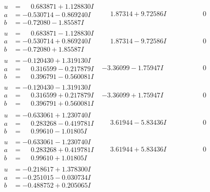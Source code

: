 \documentclass[1p]{elsarticle_modified}
\theoremstyle{definition}
\begin{document}
$$\begin{array}{c|c|c}
\begin{aligned}
u &= \phantom{-}0.683871 + 1.128830 I \\
a &= -0.530714 - 0.869240 I \\
b &= -0.72080 - 1.85587 I\end{aligned}
 & \phantom{-}1.87314 + 9.72586 I & \phantom{-0.000000 } 0 \\ \hline\begin{aligned}
u &= \phantom{-}0.683871 - 1.128830 I \\
a &= -0.530714 + 0.869240 I \\
b &= -0.72080 + 1.85587 I\end{aligned}
 & \phantom{-}1.87314 - 9.72586 I & \phantom{-0.000000 } 0 \\ \hline\begin{aligned}
u &= -0.120430 + 1.319130 I \\
a &= \phantom{-}0.316599 - 0.217879 I \\
b &= \phantom{-}0.396791 - 0.560081 I\end{aligned}
 & -3.36099 - 1.75947 I & \phantom{-0.000000 } 0 \\ \hline\begin{aligned}
u &= -0.120430 - 1.319130 I \\
a &= \phantom{-}0.316599 + 0.217879 I \\
b &= \phantom{-}0.396791 + 0.560081 I\end{aligned}
 & -3.36099 + 1.75947 I & \phantom{-0.000000 } 0 \\ \hline\begin{aligned}
u &= -0.633061 + 1.230740 I \\
a &= \phantom{-}0.283268 - 0.419781 I \\
b &= \phantom{-}0.99610 - 1.01805 I\end{aligned}
 & \phantom{-}3.61944 - 5.83436 I & \phantom{-0.000000 } 0 \\ \hline\begin{aligned}
u &= -0.633061 - 1.230740 I \\
a &= \phantom{-}0.283268 + 0.419781 I \\
b &= \phantom{-}0.99610 + 1.01805 I\end{aligned}
 & \phantom{-}3.61944 + 5.83436 I & \phantom{-0.000000 } 0 \\ \hline\begin{aligned}
u &= -0.218617 + 1.378300 I \\
a &= -0.251015 - 0.030734 I \\
b &= -0.488752 + 0.205065 I\end{aligned}

\end{array}$$
\end{document}
